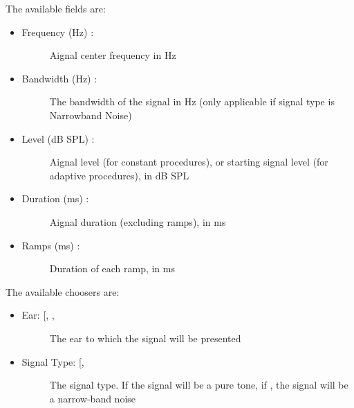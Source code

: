 \documentclass[a4paper,12pt,english]{sphinxmanual}
\begin{document}
The available fields are:
\begin{itemize}
\item {} \begin{description}
\item[{Frequency (Hz) :}] \leavevmode
Aignal center frequency in Hz

\end{description}

\item {} \begin{description}
\item[{Bandwidth (Hz) :}] \leavevmode
The bandwidth of the signal in Hz (only applicable
if signal type is Narrowband Noise)

\end{description}

\item {} \begin{description}
\item[{Level (dB SPL) :}] \leavevmode
Aignal level (for constant procedures), or starting signal level (for adaptive procedures), in dB SPL

\end{description}

\item {} \begin{description}
\item[{Duration (ms) :}] \leavevmode
Aignal duration (excluding ramps), in ms

\end{description}

\item {} \begin{description}
\item[{Ramps (ms) :}] \leavevmode
Duration of each ramp, in ms

\end{description}

\end{itemize}

The available choosers are:
\begin{itemize}
\item {} \begin{description}
\item[{Ear:         {[}, , \code{Both}{]}}] \leavevmode
The ear to which the signal will be presented

\end{description}

\item {} \begin{description}
\item[{Signal Type: {[}, \code{Narrowband Noise}{]}}] \leavevmode
The signal type. If  the signal will be a pure tone,
if , the signal will be a narrow-band noise

\end{description}

\end{itemize}
\end{document}
